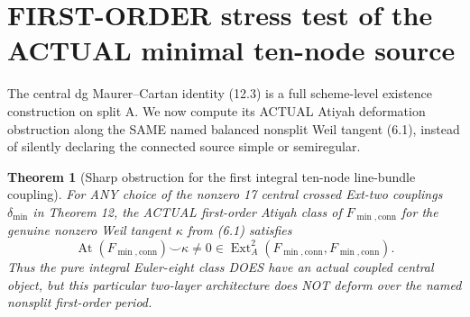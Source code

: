 \documentclass[11pt,a4paper]{article}
\newtheorem{theorem}{Theorem}[section]
\begin{document}
\section{FIRST-ORDER stress test of the ACTUAL minimal ten-node source}
The central dg
Maurer--Cartan
identity (12.3)
is a full
scheme-level
existence
construction
on split A.
We now compute
its ACTUAL
Atiyah
deformation
obstruction
along the
SAME named
balanced nonsplit
Weil tangent
(6.1), instead
of silently
declaring
the connected
source simple
or semiregular.

\begin{theorem}[Sharp obstruction for the first integral ten-node line-bundle coupling]
For ANY
choice of
the nonzero
17 central
crossed
Ext-two
couplings
\(\delta_{\min}\)
in Theorem 12,
the ACTUAL
first-order
Atiyah class
of
\(F_{\min,\mathrm{conn}}\)
for the genuine
nonzero
Weil tangent
\(\kappa\) from
(6.1) satisfies
\[
 \boxed{
 \operatorname{At}
  (F_{\min,\mathrm{conn}})
       \smile\kappa
 \ne0
   \in\operatorname{Ext}^2_A
      (F_{\min,\mathrm{conn}},
       F_{\min,\mathrm{conn}}).
 }                                                       \tag{13.1}
\]
Thus the
pure integral
Euler-eight
class DOES
have an
actual coupled
central object,
but this
particular
two-layer
architecture
does NOT
deform over
the named
nonsplit
first-order
period.
\end{theorem}
\end{document}
